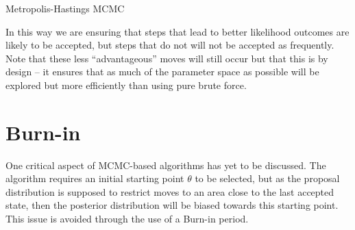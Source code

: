     \begin{algorithm}

        \BlankLine

        \DontPrintSemicolon


        \BlankLine


        \BlankLine


        \BlankLine

        \caption{Metropolis-Hastings MCMC \label{mhmcmc}}

    \end{algorithm}
    

    In this way we are ensuring that steps that lead to better likelihood outcomes are likely to be accepted, but steps that do not will not be accepted as frequently. Note that these less ``advantageous'' moves will still occur but that this is by design -- it ensures that as much of the parameter space as possible will be explored but more efficiently than using pure brute force.


\section{Burn-in}

    One critical aspect of MCMC-based algorithms has yet to be discussed. The algorithm requires an initial starting point $\theta$ to be selected, but as the proposal distribution is supposed to restrict moves to an area close to the last accepted state, then the posterior distribution will be biased towards this starting point. This issue is avoided through the use of a Burn-in period.


